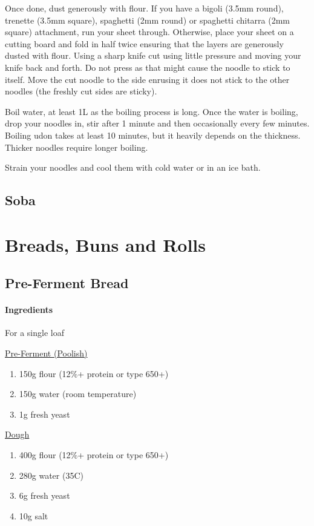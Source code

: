 \documentclass[11pt]{report}
\newcommand{\header}[1]{\subsubsection*{#1}}
\newcommand{\ingredientsection}[1]{\medskip\noindent\underline{#1}\medskip}
\begin{document}
Once done, dust generously with flour. If you have a bigoli (3.5mm round),
trenette (3.5mm square), spaghetti (2mm round) or spaghetti chitarra (2mm
square) attachment, run your sheet through. Otherwise, place your sheet on a
cutting board and fold in half twice ensuring that the layers are generously
dusted with flour. Using a sharp knife cut using little pressure and moving
your knife back and forth. Do not press as that might cause the noodle to stick
to itself. Move the cut noodle to the side enrusing it does not stick to the
other noodles (the freshly cut sides are sticky).

Boil water, at least 1L as the boiling process is long. Once the water is
boiling, drop your noodles in, stir after 1 minute and then occasionally every
few minutes. Boiling udon takes at least 10 minutes, but it heavily depends on
the thickness. Thicker noodles require longer boiling.

Strain your noodles and cool them with cold water or in an ice bath.

\section{Soba}

\chapter{Breads, Buns and Rolls}
\section{Pre-Ferment Bread}

\header{Ingredients}
For a single loaf

\ingredientsection{Pre-Ferment (Poolish)}
\begin{enumerate}
  \item 150g flour (12\%+ protein or type 650+)
  \item 150g water (room temperature)
  \item 1g fresh yeast
\end{enumerate}

\ingredientsection{Dough}
\begin{enumerate}
  \item 400g flour (12\%+ protein or type 650+)
  \item 280g water (35C)
  \item 6g fresh yeast
  \item 10g salt
\end{enumerate}
\end{document}
